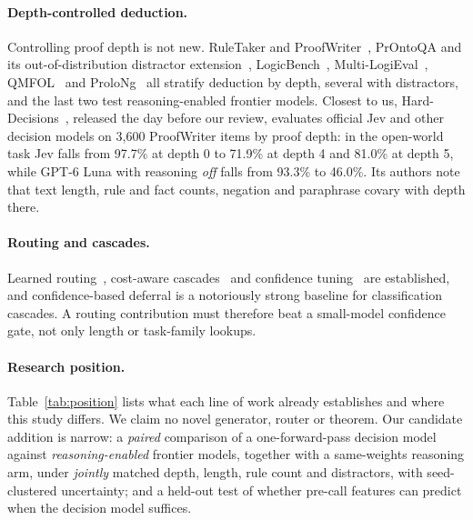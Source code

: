 \paragraph{Depth-controlled deduction.}
Controlling proof depth is not new.
RuleTaker and ProofWriter~\citep{ruletaker2020,proofwriter2021}, PrOntoQA and its out-of-distribution distractor extension~\citep{prontoqa2023,prontoqaood2023}, LogicBench~\citep{logicbench2024}, Multi-LogiEval~\citep{multilogieval2024}, QMFOL~\citep{qmfol2026} and ProloNg~\citep{prolong2026} all stratify deduction by depth, several with distractors, and the last two test reasoning-enabled frontier models.
Closest to us, Hard-Decisions~\citep{harddecisions2026}, released the day before our review, evaluates official Jev and other decision models on 3{,}600 ProofWriter items by proof depth: in the open-world task Jev falls from 97.7\% at depth 0 to 71.9\% at depth 4 and 81.0\% at depth 5, while GPT-6 Luna with reasoning \emph{off} falls from 93.3\% to 46.0\%.
Its authors note that text length, rule and fact counts, negation and paraphrase covary with depth there.

\paragraph{Routing and cascades.}
Learned routing~\citep{routellm2024,routereval2025,routerarena2025,rerouting2025}, cost-aware cascades~\citep{frugalgpt2023,tokencascade2024} and confidence tuning~\citep{gatekeeper2025} are established, and confidence-based deferral is a notoriously strong baseline for classification cascades.
A routing contribution must therefore beat a small-model confidence gate, not only length or task-family lookups.

\paragraph{Research position.}
Table~\ref{tab:position} lists what each line of work already establishes and where this study differs.
We claim no novel generator, router or theorem.
Our candidate addition is narrow: a \emph{paired} comparison of a one-forward-pass decision model against \emph{reasoning-enabled} frontier models, together with a same-weights reasoning arm, under \emph{jointly} matched depth, length, rule count and distractors, with seed-clustered uncertainty; and a held-out test of whether pre-call features can predict when the decision model suffices.

